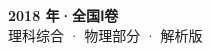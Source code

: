 \documentclass[zihao=-4, a4paper]{ctexart}
\begin{document}
\begin{center}
  {\Large\bfseries 2018 年·全国Ⅰ卷}\\[4pt]
  {\large 理科综合 · 物理部分 · 解析版}
\end{center}
\medskip
{}

\clearpage
{}

\end{document}
